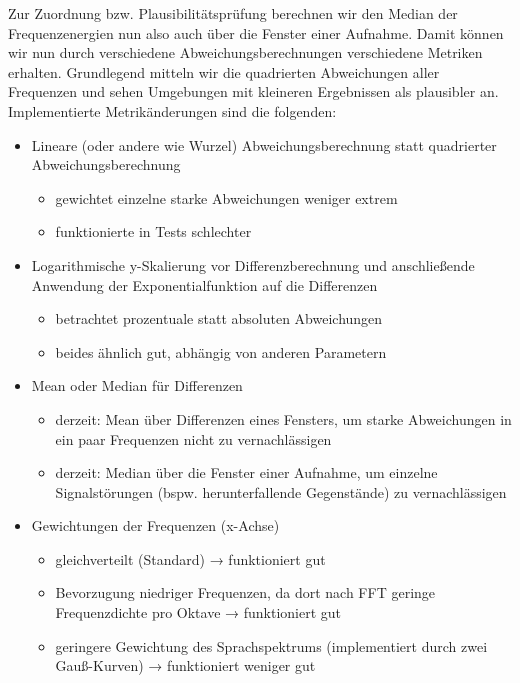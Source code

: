 \documentclass[
	fontsize=10.5pt,
	marginpar=false,
	ngerman,
	accentcolor=3d
	]{tudapub}
\begin{document}
Zur Zuordnung bzw. Plausibilitätsprüfung berechnen wir den Median der Frequenzenergien nun also auch über die Fenster einer Aufnahme. Damit können wir nun durch verschiedene Abweichungsberechnungen verschiedene Metriken erhalten. Grundlegend mitteln wir die quadrierten Abweichungen aller Frequenzen und sehen Umgebungen mit kleineren Ergebnissen als plausibler an. Implementierte Metrikänderungen sind die folgenden:
\begin{itemize}
	\item Lineare (oder andere wie Wurzel) Abweichungsberechnung statt quadrierter Abweichungsberechnung
	\begin{itemize}
		\item gewichtet einzelne starke Abweichungen weniger extrem
		\item funktionierte in Tests schlechter
	\end{itemize}
	\item Logarithmische y-Skalierung vor Differenzberechnung und anschließende Anwendung der Exponentialfunktion
auf die Differenzen
	\begin{itemize}
		\item betrachtet prozentuale statt absoluten Abweichungen
		\item beides ähnlich gut, abhängig von anderen Parametern
	\end{itemize}
	\item Mean oder Median für Differenzen
	\begin{itemize}
		\item derzeit: Mean über Differenzen eines Fensters, um starke Abweichungen in ein paar Frequenzen nicht zu vernachlässigen
		\item derzeit: Median über die Fenster einer Aufnahme, um einzelne Signalstörungen (bspw. herunterfallende Gegenstände) zu vernachlässigen
	\end{itemize}
	\item Gewichtungen der Frequenzen (x-Achse)
	\begin{itemize}
		\item gleichverteilt (Standard) → funktioniert gut
		\item Bevorzugung niedriger Frequenzen, da dort nach FFT geringe Frequenzdichte pro Oktave → funktioniert gut
		\item geringere Gewichtung des Sprachspektrums (implementiert durch zwei Gauß-Kurven) → funktioniert weniger gut
	\end{itemize}
\end{itemize}
\end{document}
